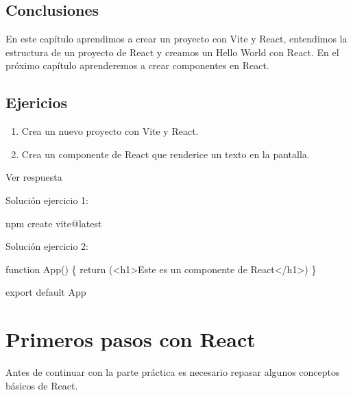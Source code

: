 \documentclass[
  a4paper,
  DIV=11,
  numbers=noendperiod,
  onepage,
  openany]{scrreprt}
\newenvironment{Shaded}{\begin{snugshade}}{\end{snugshade}}
\newcommand{\ControlFlowTok}[1]{\textcolor[rgb]{0.00,0.23,0.31}{#1}}
\newcommand{\ExtensionTok}[1]{\textcolor[rgb]{0.00,0.23,0.31}{#1}}
\newcommand{\FunctionTok}[1]{\textcolor[rgb]{0.28,0.35,0.67}{#1}}
\newcommand{\ImportTok}[1]{\textcolor[rgb]{0.00,0.46,0.62}{#1}}
\newcommand{\KeywordTok}[1]{\textcolor[rgb]{0.00,0.23,0.31}{#1}}
\newcommand{\NormalTok}[1]{\textcolor[rgb]{0.00,0.23,0.31}{#1}}
\providecommand{\tightlist}{%
  \setlength{\itemsep}{0pt}\setlength{\parskip}{0pt}}\usepackage{longtable,booktabs,array}
\begin{document}
\section{Conclusiones}\label{conclusiones-6}

En este capítulo aprendimos a crear un proyecto con Vite y React,
entendimos la estructura de un proyecto de React y creamos un Hello
World con React. En el próximo capítulo aprenderemos a crear componentes
en React.

\section{Ejericios}\label{ejericios}

\begin{enumerate}
\def\labelenumi{\arabic{enumi}.}
\tightlist
\item
  Crea un nuevo proyecto con Vite y React.
\item
  Crea un componente de React que renderice un texto en la pantalla.
\end{enumerate}

Ver respuesta

Solución ejercicio 1:

\begin{Shaded}
\begin{Highlighting}[]
\ExtensionTok{npm}\NormalTok{ create vite@latest}
\end{Highlighting}
\end{Shaded}

Solución ejercicio 2:

\begin{Shaded}
\begin{Highlighting}[]
\KeywordTok{function} \FunctionTok{App}\NormalTok{() \{}
  \ControlFlowTok{return}\NormalTok{ (}\KeywordTok{\textless{}h1\textgreater{}}\NormalTok{Este es un componente de React}\KeywordTok{\textless{}/h1\textgreater{}}\NormalTok{)}
\NormalTok{\}}

\ImportTok{export} \ImportTok{default}\NormalTok{ App}
\end{Highlighting}
\end{Shaded}

\chapter{Primeros pasos con React}\label{primeros-pasos-con-react}

Antes de continuar con la parte práctica es necesario repasar algunos
conceptos básicos de React.
\end{document}
